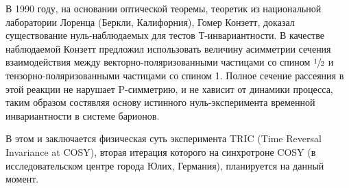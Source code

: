 \documentclass[14pt]{extarticle}
\begin{document}
В 1990 году, на основании оптической теоремы, теоретик из национальной лаборатории Лоренца (Беркли, Калифорния), Гомер Конзетт, доказал~\cite{Conzett} существование нуль-наблюдаемых для тестов Т-инвариантности. В качестве наблюдаемой Конзетт предложил использовать величину асимметрии сечения взаимодействия между векторно-поляризованными частицами со спином $\sfrac{1}{2}$ и тензорно-поляризованными частицами со спином 1. Полное сечение рассеяния в этой реакции не нарушает P-симметрию, и не хависит от динамики процесса, таким образом состявляя основу истинного нуль-эксперимента временной инвариантности в системе барионов.

В этом и заключается физическая суть эксперимента TRIC (Time Reversal Invariance at COSY), вторая итерация которого на синхротроне COSY (в исследовательском центре города Юлих, Германия), планируется на данный момент. 

%
%
\end{document}
